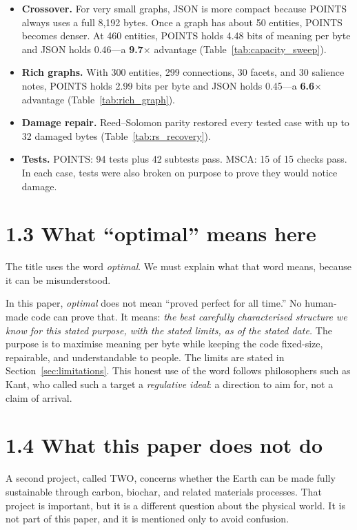 \begin{itemize}
\item \textbf{Crossover.} For very small graphs, JSON is more compact because POINTS always uses a full 8,192 bytes. Once a graph has about 50 entities, POINTS becomes denser. At 460 entities, POINTS holds 4.48 bits of meaning per byte and JSON holds 0.46---a \textbf{9.7$\times$} advantage (Table~\ref{tab:capacity_sweep}).
\item \textbf{Rich graphs.} With 300 entities, 299 connections, 30 facets, and 30 salience notes, POINTS holds 2.99 bits per byte and JSON holds 0.45---a \textbf{6.6$\times$} advantage (Table~\ref{tab:rich_graph}).
\item \textbf{Damage repair.} Reed--Solomon parity restored every tested case with up to 32 damaged bytes (Table~\ref{tab:rs_recovery}).
\item \textbf{Tests.} POINTS: 94 tests plus 42 subtests pass. MSCA: 15 of 15 checks pass. In each case, tests were also broken on purpose to prove they would notice damage.
\end{itemize}

\section*{1.3 What ``optimal'' means here}

The title uses the word \textit{optimal}. We must explain what that word means, because it can be misunderstood.

In this paper, \textit{optimal} does not mean ``proved perfect for all time.'' No human-made code can prove that. It means: \textit{the best carefully characterised structure we know for this stated purpose, with the stated limits, as of the stated date.} The purpose is to maximise meaning per byte while keeping the code fixed-size, repairable, and understandable to people. The limits are stated in Section~\ref{sec:limitations}. This honest use of the word follows philosophers such as Kant, who called such a target a \textit{regulative ideal}: a direction to aim for, not a claim of arrival.

\section*{1.4 What this paper does not do}

A second project, called TWO, concerns whether the Earth can be made fully sustainable through carbon, biochar, and related materials processes. That project is important, but it is a different question about the physical world. It is not part of this paper, and it is mentioned only to avoid confusion.


